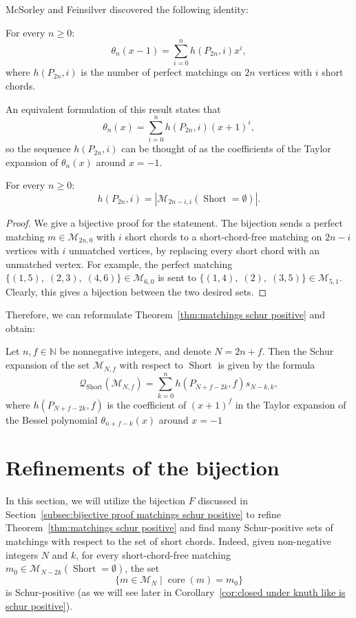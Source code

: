 \documentclass[ALCO]{cedram}
\newcommand{\Short}{\operatorname{Short}}
\newcommand{\core}{\operatorname{core}}
\newcommand{\NN}{\mathbb{N}}
\newcommand{\Q}{\mathcal{Q}}
\newcommand{\M}{\mathcal{M}}
\begin{document}
McSorley and Feinsilver \cite[Theorem 3.5]{bessel_polynomials_mathcings} discovered the following identity:
\begin{theorem}
    For every $n \ge 0$:
    \[
        \theta_n(x-1) = \sum_{i=0}^n h(P_{2n},i)x^i,
    \]
    where $h(P_{2n},i)$ is the number of perfect matchings on $2n$ vertices with $i$ short chords.
\end{theorem}

An equivalent formulation of this result states that
\[
    \theta_n(x) = \sum_{i=0}^n h(P_{2n},i)(x+1)^i,
\]
so the sequence $h(P_{2n},i)$ can be thought of as the coefficients of the Taylor expansion of $\theta_n(x)$ around $x=-1$.

\begin{observation}
    For every $n \ge 0$:
    \[
        h(P_{2n},i) = |\M_{2n-i,i} (\Short=\emptyset)|.
    \]
\end{observation}
\begin{proof}
    We give a bijective proof for the statement. The bijection sends a perfect matching $m \in \M_{2n,0}$ with $i$ short chords to a short-chord-free matching on $2n-i$ vertices with $i$ unmatched vertices, by replacing every short chord with an unmatched vertex. For example, the perfect matching $\{(1,5),\; (2,3),\; (4,6)\} \in \M_{6,0}$ is sent to $\{(1,4),\; (2),\; (3,5)\} \in \M_{5,1}$. Clearly, this gives a bijection between the two desired sets.
\end{proof}

Therefore, we can reformulate Theorem~\ref{thm:matchings schur positive} and obtain:
\begin{corollary}
\label{cor:schur expansion bessel}
    Let $n,f \in \NN$ be nonnegative integers, and denote $N=2n+f$. Then the Schur expansion of the set $\M_{N,f}$ with respect to $\Short$ is given by the formula
    \[
        \Q_{\Short} (\M_{N,f}) = \sum_{k=0}^n h(P_{N+f-2k},f) s_{N-k,k},
    \]
    where $h(P_{N+f-2k},f)$ is the coefficient of $(x+1)^f$ in the Taylor expansion of the Bessel polynomial $\theta_{n+f-k}(x)$ around $x=-1$
\end{corollary}



\section{Refinements of the bijection}
\label{sec:refinements}
In this section, we will utilize the bijection $F$ discussed in Section~\ref{subsec:bijective proof matchings schur positive} to refine Theorem~\ref{thm:matchings schur positive} and find many Schur-positive sets of matchings with respect to the set of short chords.
Indeed, given non-negative integers $N$ and $k$, for every short-chord-free matching $m_0 \in \M_{N-2k}(\Short = \emptyset)$, the set
\[
    \{m \in \M_{N} \mid \core(m) = m_0 \}
\]
is Schur-positive (as we will see later in Corollary~\ref{cor:closed under knuth like is schur positive}).
\end{document}
